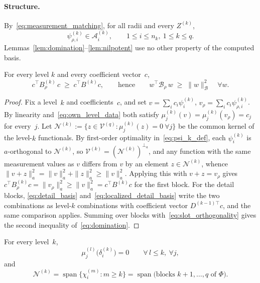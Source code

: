 \documentclass[hidelinks]{siamart}
\theoremstyle{nonumberplain}
\numberwithin{theorem}{section}
\begin{document}
\paragraph{Structure.}
By~\eqref{eq:measurement_matching}, for all radii and every $Z^{(k)}$,
\begin{equation}\label{eq:own_level_data}
  \psi^{(k)}_{\rho,i} \in \mathcal{A}^{(k)}_{i},
  \qquad 1 \leq i \leq n_k,\ 1 \leq k \leq q .
\end{equation}
Lemmas~\ref{lem:domination}--\ref{lem:nilpotent} use no other property
of the computed basis.

\begin{lemma}\label{lem:domination}
For every level $k$ and every coefficient vector~$c$,
\begin{equation}\label{eq:domination}
  c^\top B^{(k)}_\rho\, c \;\geq\; c^\top B^{(k)} c,
  \qquad \text{hence} \qquad
  w^\top \mathcal{B}_\rho\, w \;\geq\; \|w\|_{\mathcal{B}}^2
  \quad \forall w .
\end{equation}
\end{lemma}

\begin{proof}
Fix a level~$k$ and coefficients~$c$, and set
$v = \sum_i c_i \psi^{(k)}_i$,
$v_\rho = \sum_i c_i \psi^{(k)}_{\rho,i}$.  By linearity
and~\eqref{eq:own_level_data} both satisfy
$\mu^{(k)}_j(v) = \mu^{(k)}_j(v_\rho) = c_j$ for every~$j$.  Let
$\mathcal{N}^{(k)} := \{z \in \mathcal{V}^{(q)} : \mu^{(k)}_j(z) = 0
\ \forall j\}$ be the common kernel of the level-$k$ functionals.  By
first-order optimality in~\eqref{eq:psi_k_def}, each $\psi^{(k)}_i$ is
$a$-orthogonal to $\mathcal{N}^{(k)}$, so
$\mathcal{V}^{(k)} = (\mathcal{N}^{(k)})^{\perp_a}$, and any function
with the same measurement values as $v$ differs from $v$ by an element
$z \in \mathcal{N}^{(k)}$, whence
$\|v+z\|_a^2 = \|v\|_a^2 + \|z\|_a^2 \geq \|v\|_a^2$.  Applying this
with $v + z = v_\rho$ gives
$c^\top B^{(k)}_\rho c = \|v_\rho\|_a^2 \geq \|v\|_a^2 = c^\top B^{(k)} c$
for the first block.  For the detail blocks, \eqref{eq:detail_basis}
and~\eqref{eq:localized_detail_basis} write the two combinations as
level-$k$ combinations with coefficient vector $D^{(k-1)\top} c$, and
the same comparison applies.  Summing over blocks
with~\eqref{eq:slot_orthogonality} gives the second inequality
of~\eqref{eq:domination}.
\end{proof}

\begin{lemma}\label{lem:annihilation}
For every level~$k$,
\begin{equation}\label{eq:error_annihilation}
  \mu^{(l)}_j\bigl(\delta^{(k)}_i\bigr) = 0
  \qquad \forall\, l \leq k,\ \forall j ,
\end{equation}
and
\begin{equation}\label{eq:kernel_identification}
  \mathcal{N}^{(k)}
  = \operatorname{span}\bigl\{\chi^{(m)}_i : m \geq k\bigr\}
  = \operatorname{span}\bigl(\text{blocks } k+1, \ldots, q
    \text{ of } \Phi\bigr).
\end{equation}
\end{lemma}
\end{document}
